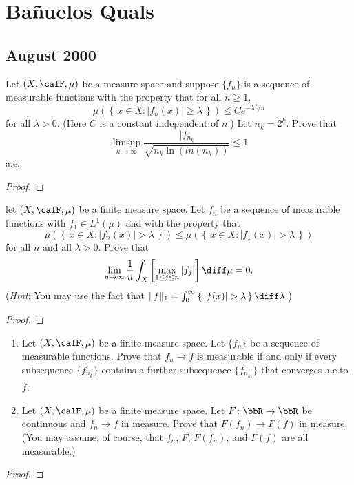 \section{Bañuelos Quals}
\subsection{August 2000}
\begin{problem}
Let $(X,\calF,\mu)$ be a measure space and suppose $\{f_n\}$ is a sequence
of measurable functions with the property that for all $n\geq 1$,
\[
\mu\left(\left\{\,x\in X:|f_n(x)|\geq\lambda\,\right\}\right)\leq C e^{-\lambda^2/n}
\]
for all $\lambda>0$. (Here $C$ is a constant independent of $n$.) Let
$n_k=2^k$. Prove that
\[
\limsup_{k\to\infty}\frac{|f_{n_k}}{\sqrt{n_k\ln(ln(n_k))}}\leq 1
\]
a.e.
\end{problem}
\begin{proof}
\end{proof}

\begin{problem}
let $(X,\calF,\mu)$ be a finite measure space. Let $f_n$ be a sequence of
measurable functions with $f_1\in L^1(\mu)$ and with the property that
\[
\mu\left(\left\{\,x\in X:|f_n(x)|>\lambda\,\right\}\right)
\leq
\mu\left(\left\{\,x\in X:|f_1(x)|>\lambda\,\right\}\right)
\]
for all $n$ and all $\lambda>0$. Prove that
\[
\lim_{n\to\infty}\frac{1}{n}\int_X\left[\max_{1\leq j\leq n}|f_j|\right]\diff\mu=0.
\]
(\emph{Hint}: You may use the fact that
$\|f\|_1=\int_0^\infty\left\{\,|f(x)|>\lambda\,\right\}\diff\lambda$.)
\end{problem}
\begin{proof}
\end{proof}

\begin{problem}
\begin{enumerate}[label=(\roman*)]
\item Let $(X,\calF,\mu)$ be a finite measure space. Let $\{f_n\}$ be a sequence
of measurable functions. Prove that $f_n\to f$ is measurable if and only if
every subsequence $\{f_{n_k}\}$ contains a further subsequence
$\{f_{n_{k_j}}\}$ that converges a.e.\@ to $f$.
\item Let $(X,\calF,\mu)$ be a finite measure space. Let
$F\colon\bbR\to\bbR$ be continuous and $f_n\to f$ in measure. Prove that
$F(f_n)\to F(f)$ in measure. (You may assume, of course, that $f_n$, $F$,
$F(f_n)$, and $F(f)$ are all measurable.)
\end{enumerate}
\end{problem}
\begin{proof}
\end{proof}

